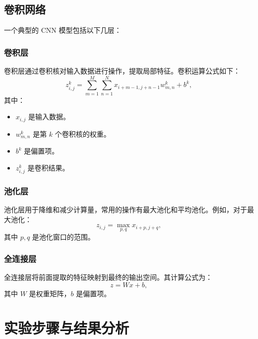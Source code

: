 \documentclass[12pt, a4paper, oneside]{ctexart}
\numberwithin{equation}{section}  %
\begin{document}
\subsection{卷积网络}
一个典型的 CNN 模型包括以下几层：

\subsubsection{卷积层}
卷积层通过卷积核对输入数据进行操作，提取局部特征。卷积运算公式如下：
\[
z_{i,j}^k = \sum_{m=1}^{M} \sum_{n=1}^{N} x_{i+m-1,j+n-1} w_{m,n}^k + b^k,
\]
其中：
\begin{itemize}
    \item $x_{i,j}$ 是输入数据。
    \item $w_{m,n}^k$ 是第 $k$ 个卷积核的权重。
    \item $b^k$ 是偏置项。
    \item $z_{i,j}^k$ 是卷积结果。
\end{itemize}

\subsubsection{池化层}
池化层用于降维和减少计算量，常用的操作有最大池化和平均池化。例如，对于最大池化：
\[
z_{i,j} = \max_{p,q} x_{i+p,j+q},
\]
其中 $p,q$ 是池化窗口的范围。

\subsubsection{全连接层}
全连接层将前面提取的特征映射到最终的输出空间。其计算公式为：
\[
z = Wx + b,
\]
其中 $W$ 是权重矩阵，$b$ 是偏置项。

\section{实验步骤与结果分析}
\end{document}
